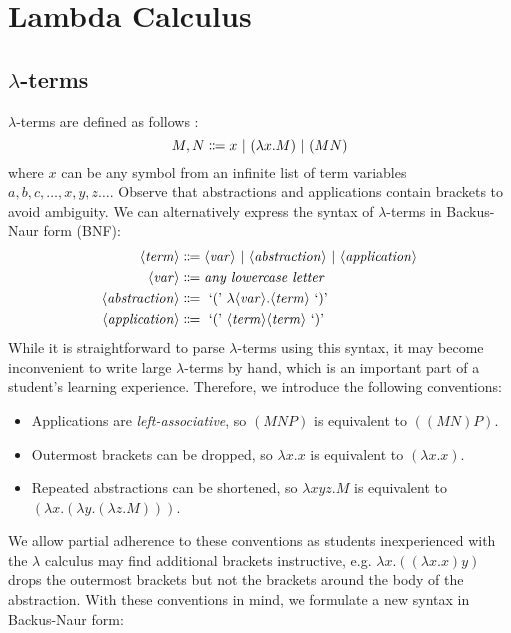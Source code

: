 \section{Lambda Calculus}

\subsection{\(\lambda\)-terms}\label{lambda:lambda-terms}
$\lambda$-terms are defined as follows \cite{church:1941}:
\[
    M,N \Coloneqq x \ |\  (\lambda x. M) \ |\  (MN)
\]
where $x$ can be any symbol from an infinite list of term variables $a, b, c, \ldots, x, y, z \ldots$. Observe that abstractions and applications contain brackets to avoid ambiguity. We can alternatively express the syntax of $\lambda$-terms in Backus-Naur form (BNF):
\begin{align*}
    \langle\mathit{term}\rangle &\Coloneqq \langle\mathit{var}\rangle \ |\  \langle\mathit{abstraction}\rangle \ |\  \langle\mathit{application}\rangle \\
    \langle\mathit{var}\rangle &\Coloneqq \textit{any lowercase letter} \\
    \langle\mathit{abstraction}\rangle &\Coloneqq \text{ `(' } \lambda \langle\mathit{var}\rangle. \langle\mathit{term}\rangle \text{ `)' } \\
    \langle\mathit{application}\rangle &\Coloneqq \text{ `(' } \langle\mathit{term}\rangle \langle\mathit{term}\rangle \text{ `)' }
\end{align*}
While it is straightforward to parse $\lambda$-terms using this syntax, it may become inconvenient to write large $\lambda$-terms by hand, which is an important part of a student's learning experience. Therefore, we introduce the following conventions:
\begin{itemize}
    \item Applications are \textit{left-associative}, so $(MNP)$ is equivalent to $((MN)P)$.
    \item Outermost brackets can be dropped, so $\lambda x. x$ is equivalent to $(\lambda x. x)$.
    \item Repeated abstractions can be shortened, so $\lambda xyz. M$ is equivalent to $(\lambda x. (\lambda y. (\lambda z. M)))$.
\end{itemize}
We allow partial adherence to these conventions as students inexperienced with the $\lambda$ calculus may find additional brackets instructive, e.g. $\lambda x. ((\lambda x. x) y)$ drops the outermost brackets but not the brackets around the body of the abstraction. With these conventions in mind, we formulate a new syntax in Backus-Naur form:
